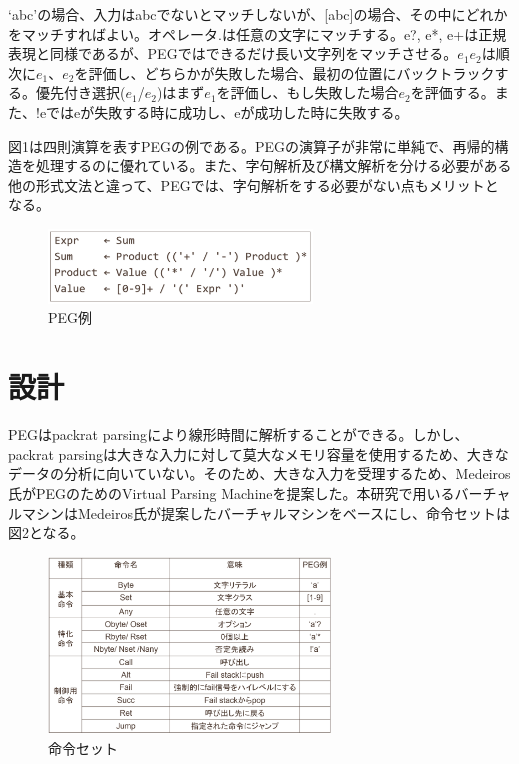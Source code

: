 \documentclass[submit,techrep]{ipsj}
\begin{document}
`abc'の場合、入力はabcでないとマッチしないが、[abc]の場合、その中にどれかをマッチすればよい。オペレータ.は任意の文字にマッチする。e?, e*, e+は正規表現と同様であるが、PEGではできるだけ長い文字列をマッチさせる。$e_1$$e_2$は順次に$e_1$、$e_2$を評価し、どちらかが失敗した場合、最初の位置にバックトラックする。優先付き選択($e_1$/$e_2$)はまず$e_1$を評価し、もし失敗した場合$e_2$を評価する。また、!eではeが失敗する時に成功し、eが成功した時に失敗する。

図1は四則演算を表すPEGの例である。PEGの演算子が非常に単純で、再帰的構造を処理するのに優れている。また、字句解析及び構文解析を分ける必要がある他の形式文法と違って、PEGでは、字句解析をする必要がない点もメリットとなる。

\begin{figure}[h]
    \begin{center}
        \includegraphics[width=70mm]{./fig/PEG_sample}
       \caption{PEG例}
    \end{center}
\end{figure}



\section{設計}

PEGはpackrat parsing\cite{PP1}\cite{PP2}\cite{PP3}により線形時間に解析することができる。しかし、packrat parsingは大きな入力に対して莫大なメモリ容量を使用するため、大きなデータの分析に向いていない。そのため、大きな入力を受理するため、Medeiros氏がPEGのためのVirtual Parsing Machine\cite{VM}を提案した。本研究で用いるバーチャルマシンはMedeiros氏が提案したバーチャルマシンをベースにし、命令セットは図2となる。

\begin{figure}[h]
    \begin{center}
        \includegraphics[width=75mm]{./fig/VM1}
       \caption{命令セット}
    \end{center}
\end{figure}
\end{document}
